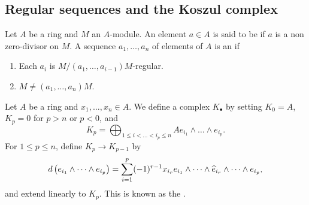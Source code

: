 \subsection{Regular sequences and the Koszul complex}

\begin{definition}
    Let $A$ be a ring and $M$ an $A$-module. An element $a\in A$ is said to be  if $a$ is a non zero-divisor on $M$.  A sequence $a_1,\dots,a_n$ of elements of $A$ is an  if 
    \begin{enumerate}[label=(\arabic*)]
        \item Each $a_i$ is $M/(a_1,\dots,a_{i - 1})M$-regular.
        \item $M\ne (a_1,\dots,a_n)M$.
    \end{enumerate}
\end{definition}

\begin{definition}
    Let $A$ be a ring and $x_1,\dots,x_n\in A$. We define a complex $K_\bullet$ by setting $K_0 = A$, $K_p = 0$ for $p > n$ or $p < 0$, and 
    \begin{equation*}
        K_p = \bigoplus_{1\le i < \dots < i_p\le n} A e_{i_1}\wedge\dots\wedge e_{i_p}.
    \end{equation*}
    For $1\le p\le n$, define $K_p\to K_{p - 1}$ by 
    \begin{equation*}
        d\left(e_{i_1}\wedge\dots\wedge e_{i_p}\right) = \sum_{i = 1}^p (-1)^{r - 1}x_{i_r} e_{i_1}\wedge\dots\wedge\widehat{e}_{i_r}\wedge\dots\wedge e_{i_p},
    \end{equation*}
    and extend linearly to $K_p$. This is known as the .
\end{definition}

